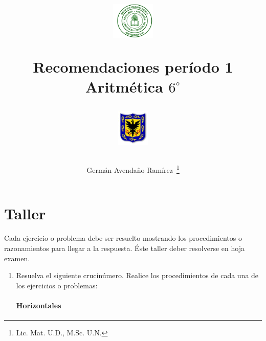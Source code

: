 \documentclass[twoside]{article}
\author{Germ\'an Avenda\~no Ram\'irez~\thanks{Lic. Mat. U.D., M.Sc. U.N.}}
\title{\begin{minipage}{.2\textwidth}
\includegraphics[height=1.75cm]{Images/logo-colegio.png}\end{minipage}
\begin{minipage}{.55\textwidth}
\begin{center}
Recomendaciones período 1\\
Aritmética $6^{\circ}$
\end{center}
\end{minipage}\hfill
\begin{minipage}{.2\textwidth}
\includegraphics[height=1.75cm]{Images/logo-sed.png} 
\end{minipage}}
\date{}
\begin{document}
\maketitle
\begin{minipage}{.95\textwidth}
\end{minipage}
\section*{Taller}
Cada ejercicio o problema debe ser resuelto mostrando los procedimientos o razonamientos para llegar a la respuesta. Éste taller deber resolverse en hoja examen.
\begin{enumerate}
\item Resuelva el siguiente crucinúmero. Realice los procedimientos de cada una de los ejercicios o problemas:
\paragraph*{Horizontales}
\begin{enumerate}
\end{enumerate}

\end{enumerate}
\end{document}
